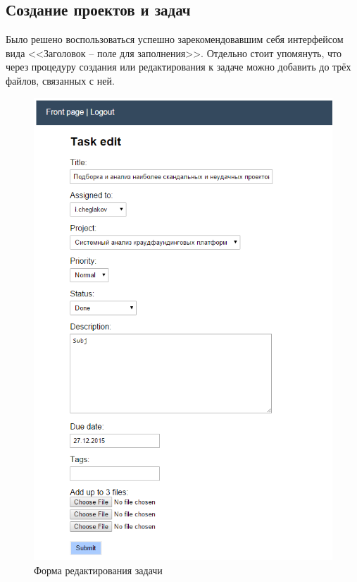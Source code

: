 \documentclass[a4paper, 14pt]{extarticle}
\begin{document}
\subsection{Создание проектов и задач}
Было решено воспользоваться успешно зарекомендовавшим себя интерфейсом вида <<Заголовок -- поле для заполнения>>. Отдельно стоит упомянуть, что через процедуру создания или редактирования к задаче можно добавить до трёх файлов, связанных с ней.

\begin{figure}[!htb]
  \centering
    \includegraphics[scale=0.6]{../shared_images/frontend/task-edit.png}
   \caption{Форма редактирования задачи}
    \label{fig:start}
\end{figure}
\end{document}

